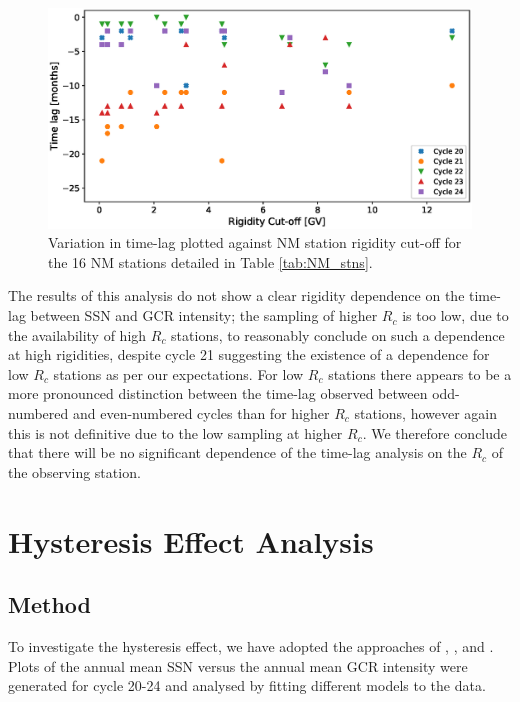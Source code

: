 \begin{figure}
	\includegraphics[width=\columnwidth]{rigidity_analysis.eps}
	\caption{Variation in time-lag plotted against NM station rigidity cut-off for the 16 NM stations detailed in Table \ref{tab:NM_stns}.}
	\label{fig:time_lags_rigidity}
\end{figure}

The results of this analysis do not show a clear rigidity dependence on the time-lag between SSN and GCR intensity; the sampling of higher $R_c$ is too low, due to the availability of high $R_c$ stations, to reasonably conclude on such a dependence at high rigidities, despite cycle 21 suggesting the existence of a dependence for low $R_c$ stations as per our expectations. For low $R_c$ stations there appears to be a more pronounced distinction between the time-lag observed between odd-numbered and even-numbered cycles than for higher $R_c$ stations, however again this is not definitive due to the low sampling at higher $R_c$. We therefore conclude that there will be no significant dependence of the time-lag analysis on the $R_c$ of the observing station.


\section{Hysteresis Effect Analysis}
\label{sec:hysteresis}


\subsection{Method}
\label{HA-Method} 

To investigate the hysteresis effect, we have adopted the approaches of \cite{van_allen_modulation_2000}, \cite{singh_solar_2008}, and \cite{inceoglu_modeling_2014}. Plots of the annual mean SSN versus the annual mean GCR intensity were generated for cycle 20-24 and analysed by fitting different models to the data.

